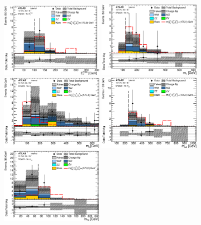 \begin{figure}[htbp]
\centering
\includegraphics[width=0.45\textwidth]{data/plot/PlotsN1/all_Met_SRjet23_NoMet.eps}
\includegraphics[width=0.45\textwidth]{data/plot/PlotsN1/all_Mt_SRjet23_NoMt.eps} \\
\includegraphics[width=0.45\textwidth]{data/plot/PlotsN1/all_Mlj_SRjet23_NoMlj.eps}
\includegraphics[width=0.45\textwidth]{data/plot/PlotsN1/all_Meff_SRjet23_NoMeff.eps} \\
\includegraphics[width=0.45\textwidth]{data/plot/PlotsN1/all_Mt2_SRjet23_NoMt2.eps}

\end{figure}
